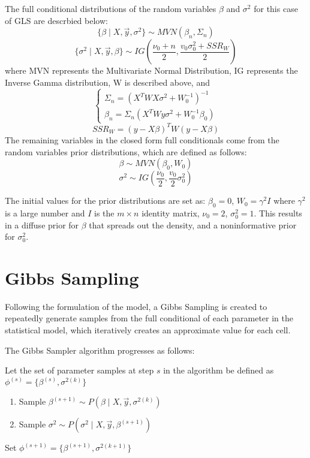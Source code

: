 \documentclass[12pt,twoside]{dukestatscithesis}
\theoremstyle{definition}
\theoremstyle{definition}
\theoremstyle{definition}
\theoremstyle{remark}
\begin{document}
The full conditional distributions of the random variables \(\beta\) and
\(\sigma^2\) for this case of GLS are descrbied below:
\[\{\beta \mid X, \vec{y}, \sigma^2\} \sim MVN (\beta_n, \Sigma_n)\]
\[\{\sigma^2 \mid X, \vec{y}, \beta\} \sim IG (\frac{\nu_0 + n}{2}, \frac{v_0\sigma^2_0 + SSR_W}{2})\]
where MVN represents the Multivariate Normal Distribution, IG represents
the Inverse Gamma distribution, W is described above, and
\[ \begin{cases}
      \Sigma_n = (X^TWX\sigma^2+W_0^{-1})^{-1}\\
      \beta_n = \Sigma_n(X^TWy\sigma^2 + W_0^{-1} \beta_0)
    \end{cases}\] \[SSR_W = (y - X\beta)^TW(y-X\beta)\]
The remaining variables in the closed form full conditionals come from
the random variables prior distributions, which are defined as follows:
\[\beta \sim MVN (\beta_0, W_0)\]
\[\sigma^2 \sim IG (\frac{\nu_0}{2}, \frac{v_0}{2}\sigma_0^2)\]

The initial values for the prior distributions are set as:
\(\beta_0 = 0\), \(W_0 = \gamma^2I\) where \(\gamma^2\) is a large
number and \(I\) is the \(m \times n\) identity matrix, \(\nu_0 = 2\),
\(\sigma_0^2 = 1\). This results in a diffuse prior for \(\beta\) that
spreads out the density, and a noninformative prior for \(\sigma^2_0\).

\section{Gibbs Sampling}\label{gibbs-sampling}

Following the formulation of the model, a Gibbs Sampling is created to
repeatedly generate samples from the full conditional of each parameter
in the statistical model, which iteratively creates an approximate value
for each cell.

The Gibbs Sampler algorithm progresses as follows:

Let the set of parameter samples at step \(s\) in the algorithm be
defined as \(\phi^{(s)} = \{\beta^{(s)}, \sigma^{2(k)}\}\)
\begin{enumerate}
\def\labelenumi{\arabic{enumi}.}
\item
  Sample \(\beta^{(s+1)} \sim P(\beta \mid X, \vec{y}, \sigma^{2(k)})\)
\item
  Sample \(\sigma^2 \sim P(\sigma^2 \mid X, \vec{y}, \beta^{(s+1)})\)
\end{enumerate}
Set \(\phi^{(s+1)} = \{\beta^{(s+1)}, \sigma^{2(k+1)}\}\)
\end{document}
